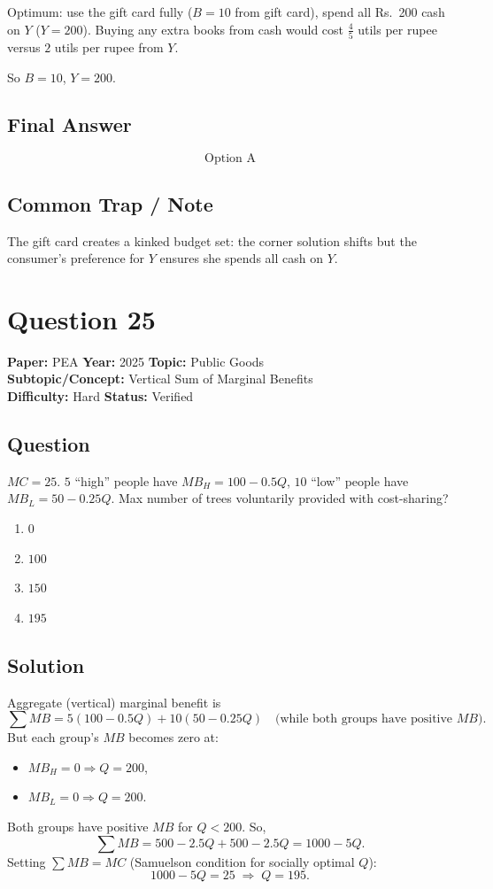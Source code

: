\documentclass[11pt]{article}
\begin{document}
Optimum: use the gift card fully ($B = 10$ from gift card), spend all Rs.\ 200 cash on $Y$ ($Y = 200$). Buying any extra books from cash would cost $\tfrac{4}{5}$ utils per rupee versus $2$ utils per rupee from $Y$.

So $B = 10$, $Y = 200$.

\subsection*{Final Answer}
\[
\boxed{\text{Option A}}
\]

\subsection*{Common Trap / Note}
The gift card creates a kinked budget set: the corner solution shifts but the consumer's preference for $Y$ ensures she spends all cash on $Y$.

\section*{Question 25}
\textbf{Paper:} PEA \quad \textbf{Year:} 2025 \quad \textbf{Topic:} Public Goods \\
\textbf{Subtopic/Concept:} Vertical Sum of Marginal Benefits \\
\textbf{Difficulty:} Hard \quad \textbf{Status:} Verified

\subsection*{Question}
$MC = 25$. $5$ ``high'' people have $MB_H = 100 - 0.5Q$, $10$ ``low'' people have $MB_L = 50 - 0.25Q$. Max number of trees voluntarily provided with cost-sharing?

\begin{enumerate}[label=(\Alph*)]
\item $0$ \item $100$ \item $150$ \item $195$
\end{enumerate}

\subsection*{Solution}
Aggregate (vertical) marginal benefit is
\[
\sum MB = 5(100 - 0.5Q) + 10(50 - 0.25 Q) \quad \text{(while both groups have positive } MB).
\]
But each group's $MB$ becomes zero at:
\begin{itemize}[leftmargin=*]
\item $MB_H = 0 \Rightarrow Q = 200$,
\item $MB_L = 0 \Rightarrow Q = 200$.
\end{itemize}
Both groups have positive $MB$ for $Q < 200$. So,
\[
\sum MB = 500 - 2.5 Q + 500 - 2.5 Q = 1000 - 5 Q.
\]
Setting $\sum MB = MC$ (Samuelson condition for socially optimal $Q$):
\[
1000 - 5 Q = 25 \;\Longrightarrow\; Q = 195.
\]
\end{document}
